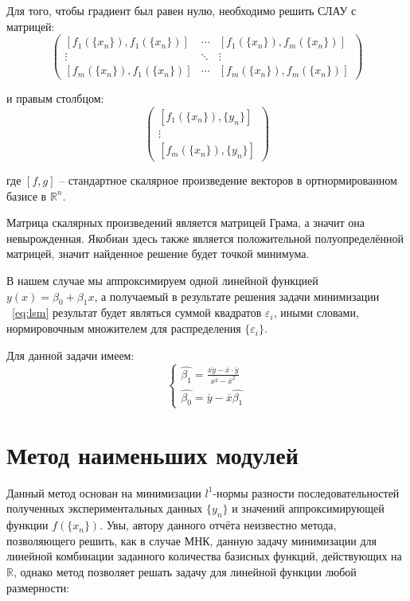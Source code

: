 Для того, чтобы градиент был равен нулю, необходимо решить СЛАУ с матрицей:
\begin{equation}\label{eq:lsmMatr}
\begin{pmatrix}
[f_1(\{x_n\}), f_1(\{x_n\})] & \cdots & [f_1(\{x_n\}), f_m(\{x_n\})] \\
\vdots & \ddots & \vdots \\
[f_m(\{x_n\}), f_1(\{x_n\})] & \cdots & [f_m(\{x_n\}), f_m(\{x_n\})]
\end{pmatrix}
\end{equation}

и правым столбцом:
\begin{equation}
\begin{pmatrix}
[f_1(\{x_n\}), \{y_n\}] \\
\vdots\\
[f_m(\{x_n\}), \{y_n\}]
\end{pmatrix}
\end{equation}

где $[f, g]$ -- стандартное скалярное произведение векторов в ортнормированном базисе в $\mathbb{R}^n$.

Матрица скалярных произведений является матрицей Грама, а значит она невырожденная. Якобиан здесь также является положительной полуопределённой матрицей, значит найденное решение будет точкой минимума.

В нашем случае мы аппроксимируем одной линейной функцией $y(x) = \beta_0 + \beta_1 x$, а получаемый в результате решения задачи минимизации ~\eqref{eq:lsm} результат будет являться суммой квадратов $\varepsilon_i$, иными словами, нормировочным множителем для распределения $\{\varepsilon_i\}$.

Для данной задачи имеем:
\begin{equation}
\begin{cases}
	\hat{\beta_1} = \frac{\overline{xy} - \overline{x} \cdot \overline{y}}{\overline{x^2}-\overline{x}^2} \\
	
	\hat{\beta_0} = \overline{y} - \overline{x} \hat{\beta_1}
\end{cases}	
\end{equation}

\section{Метод наименьших модулей}

Данный метод основан на минимизации $l^1$-нормы разности последовательностей полученных экспериментальных данных $\{y_n\}$ и значений аппроксимирующей функции $f(\{x_n\})$. Увы, автору данного отчёта неизвестно метода, позволяющего решить, как в случае МНК, данную задачу минимизации для линейной комбинации заданного количества базисных функций, действующих на $\mathbb{R}$, однако метод позволяет решать задачу для линейной функции любой размерности:

